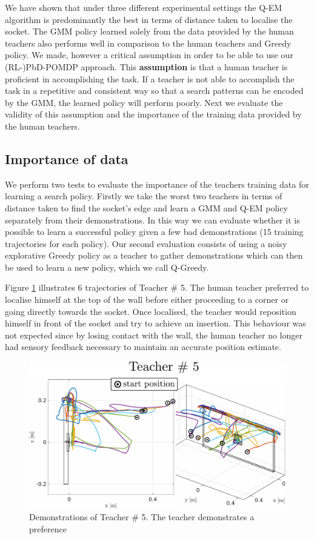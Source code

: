 We have shown that under three different experimental settings the Q-EM algorithm is predominantly the best in terms of distance taken 
to localise the socket. The GMM policy learned solely from the data provided by the human teachers also performs well in comparison to  
the human teachers and Greedy policy. We made, however a critical assumption in order to be able to use our (RL-)PbD-POMDP approach. 
This \textbf{assumption} is that a human teacher is proficient in accomplishing the task. If a teacher is not able to accomplish 
the task in a repetitive and consistent way so that a search patterns can be encoded by the GMM, the learned policy will perform poorly.
Next we evaluate the validity of this assumption and the importance of the training data provided by the human teachers.
% 
\subsection{Importance of data}

We perform two tests to evaluate the importance of the teachers training data for learning a search policy. Firstly we take the 
worst two teachers in terms of distance taken to find the socket's edge and learn a GMM and Q-EM policy separately from their 
demonstrations. In this way we can evaluate whether it is possible to learn a successful policy given 
a few bad demonstrations (15 training trajectories for each policy). Our second evaluation consists of using a noisy 
explorative Greedy policy as a teacher to gather demonstrations which can then be used to learn a new policy, which we call Q-Greedy. 

Figure \ref{fig:subj_5_traj} illustrates 6 trajectories of Teacher \# 5. The human teacher preferred to
localise himself at the top of the wall before either proceeding to a corner or going directly towards the socket. Once localised, the teacher 
would reposition himself in front of the socket and try to achieve an insertion. This behaviour was not expected 
since by losing contact with the wall, the human teacher no longer had sensory feedback necessary 
to maintain an accurate position estimate.

\begin{figure}
 \centering
    \includegraphics[width=\textwidth]{./ch4-PiH/Figures/Fig/subject5.pdf}
    \caption{Demonstrations of Teacher \# 5. The teacher demonstrates a preference}
    \label{fig:subj_5_traj}
 \end{figure}
 
